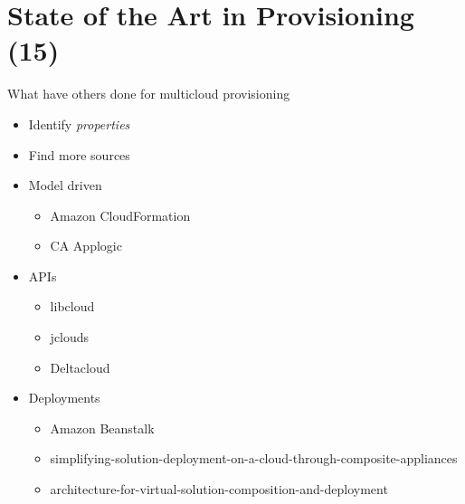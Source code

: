 \section{State of the Art in Provisioning (15)}

What have others done for multicloud provisioning

\begin{itemize}
  \item Identify \emph{properties}
  \item Find more sources
  \item Model driven
    \begin{itemize}
      \item Amazon CloudFormation
      \item CA Applogic
    \end{itemize}
  \item APIs
    \begin{itemize}
      \item libcloud
      \item jclouds
      \item Deltacloud
    \end{itemize}
  \item Deployments
    \begin{itemize}
      \item Amazon Beanstalk
      \item simplifying-solution-deployment-on-a-cloud-through-composite-appliances
      \item architecture-for-virtual-solution-composition-and-deployment
    \end{itemize}
\end{itemize}
